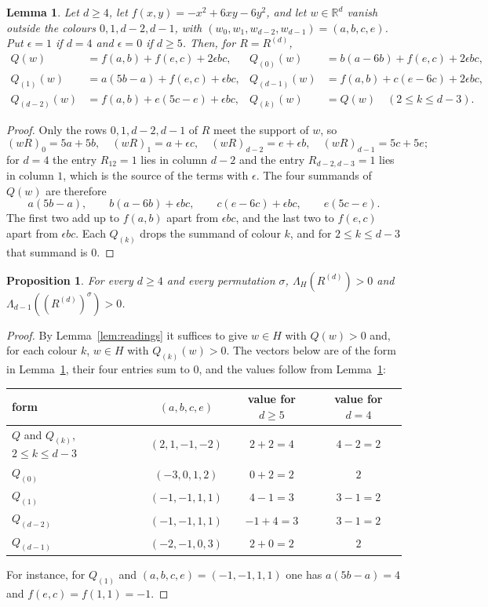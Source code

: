 \documentclass[11pt]{amsart}
\newtheorem{proposition}[theorem]{Proposition}
\newtheorem{lemma}[theorem]{Lemma}
\theoremstyle{definition}
\theoremstyle{remark}
\newcommand{\R}{\mathbb R}
\begin{document}
\begin{lemma}\label{lem:split}
Let $d\ge4$, let $f(x,y)=-x^2+6xy-6y^2$, and let $w\in\R^d$ vanish outside the colours $0,1,d-2,d-1$, with $(w_0,w_1,w_{d-2},w_{d-1})=(a,b,c,e)$. Put $\epsilon=1$ if $d=4$ and $\epsilon=0$ if $d\ge5$. Then, for $R=R^{(d)}$,
\begin{align*}
Q(w)&=f(a,b)+f(e,c)+2\epsilon bc, & Q_{(0)}(w)&=b(a-6b)+f(e,c)+2\epsilon bc,\\
Q_{(1)}(w)&=a(5b-a)+f(e,c)+\epsilon bc, & Q_{(d-1)}(w)&=f(a,b)+c(e-6c)+2\epsilon bc,\\
Q_{(d-2)}(w)&=f(a,b)+e(5c-e)+\epsilon bc, & Q_{(k)}(w)&=Q(w)\quad(2\le k\le d-3).
\end{align*}
\end{lemma}

\begin{proof}
Only the rows $0,1,d-2,d-1$ of $R$ meet the support of $w$, so
\[
(wR)_0=5a+5b,\quad (wR)_1=a+\epsilon c,\quad (wR)_{d-2}=e+\epsilon b,\quad (wR)_{d-1}=5c+5e;
\]
for $d=4$ the entry $R_{12}=1$ lies in column $d-2$ and the entry $R_{d-2,d-3}=1$ lies in column $1$, which is the source of the terms with $\epsilon$. The four summands of $Q(w)$ are therefore
\[
a(5b-a),\qquad b(a-6b)+\epsilon bc,\qquad c(e-6c)+\epsilon bc,\qquad e(5c-e).
\]
The first two add up to $f(a,b)$ apart from $\epsilon bc$, and the last two to $f(e,c)$ apart from $\epsilon bc$. Each $Q_{(k)}$ drops the summand of colour $k$, and for $2\le k\le d-3$ that summand is $0$.
\end{proof}

\begin{proposition}\label{prop:family}
For every $d\ge 4$ and every permutation $\sigma$, $\Lambda_H(R^{(d)})>0$ and $\Lambda_{d-1}((R^{(d)})^\sigma)>0$.
\end{proposition}

\begin{proof}
By Lemma~\ref{lem:readings} it suffices to give $w\in H$ with $Q(w)>0$ and, for each colour $k$, $w\in H$ with $Q_{(k)}(w)>0$. The vectors below are of the form in Lemma~\ref{lem:split}, their four entries sum to $0$, and the values follow from Lemma~\ref{lem:split}:
\begin{center}
\renewcommand{\arraystretch}{1.15}
\begin{tabular}{lccc}
form & $(a,b,c,e)$ & value for $d\ge5$ & value for $d=4$\\ \hline
$Q$ and $Q_{(k)}$, $2\le k\le d-3$ & $(2,1,-1,-2)$ & $2+2=4$ & $4-2=2$\\
$Q_{(0)}$ & $(-3,0,1,2)$ & $0+2=2$ & $2$\\
$Q_{(1)}$ & $(-1,-1,1,1)$ & $4-1=3$ & $3-1=2$\\
$Q_{(d-2)}$ & $(-1,-1,1,1)$ & $-1+4=3$ & $3-1=2$\\
$Q_{(d-1)}$ & $(-2,-1,0,3)$ & $2+0=2$ & $2$
\end{tabular}
\end{center}
For instance, for $Q_{(1)}$ and $(a,b,c,e)=(-1,-1,1,1)$ one has $a(5b-a)=4$ and $f(e,c)=f(1,1)=-1$.
\end{proof}
\end{document}
